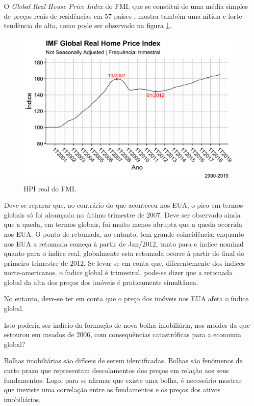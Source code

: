 \documentclass[
	12pt,				%
	oneside,			%
	a4paper,			%
	chapter=TITLE,		%
	section=TITLE,		%
	english,			%
	brazil				%
	]{abntex2}
\begin{document}
O \emph{Global Real House Price Index} do \gls{FMI}, que se constitui de uma média
simples de preços reais de residências em 57 países \autocite{fmitwa}, mostra também uma
nítida e forte tendência de alta, como pode ser observado na figura
\ref{fig:global-rhpi}.
\begin{figure}[H]

{\centering \includegraphics[width=0.7\linewidth]{images/global-rhpi-1} 

}

\caption{HPI real do FMI.}\label{fig:global-rhpi}
\end{figure}
Deve-se reparar que, ao contrário do que aconteceu nos EUA, o pico em termos
globais só foi alcançado no último trimestre de 2007. Deve ser observado ainda
que a queda, em termos globais, foi muito menos abrupta que a queda ocorrida
nos EUA. O ponto de retomada, no entanto, tem grande coincidência: enquanto nos
EUA a retomada começa à partir de Jan/2012, tanto para o índice nominal quanto
para o índice real, globalmente esta retomada ocorre à partir do final do
primeiro trimestre de 2012. Se levar-se em conta que, diferentemente dos índices
norte-americanos, o índice global é trimestral, pode-se dizer que a retomada
global da alta dos preços dos imóveis é praticamente simultânea.

No entanto, deve-se ter em conta que o preço dos imóveis nos EUA afeta o índice
global.

Isto poderia ser indício da formação de nova bolha imobiliária, nos moldes da
que estourou em meados de 2006, com consequências catastróficas para a economia
global?

Bolhas imobiliárias são difíceis de serem identificadas. Bolhas são fenômenos
de curto prazo que representam descolamentos dos preços em relação aos seus
fundamentos. Logo, para se afirmar que existe uma bolha, é necessário mostrar
que inexiste uma correlação entre os fundamentos e os preços dos ativos
imobiliários.
\end{document}
